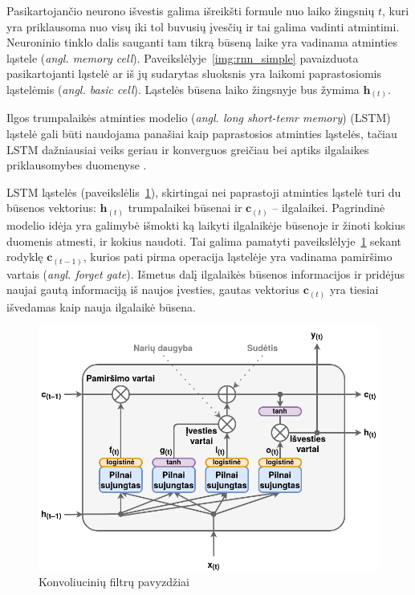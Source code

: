 \documentclass{VUMIFPSbakalaurinis}
\begin{document}
{	Pasikartojančio neurono išvestis galima išreikšti formule nuo laiko žingsnių \(t\), kuri yra priklausoma nuo visų iki tol buvusių įvesčių ir tai galima vadinti atmintimi. Neuroninio tinklo dalis sauganti tam tikrą būseną laike yra vadinama atminties ląstele (\textit{angl. memory cell}). Paveikslėlyje~\ref{img:rnn_simple} pavaizduota pasikartojanti ląstelė ar iš jų sudarytas sluoksnis yra laikomi paprastosiomis ląstelėmis (\textit{angl. basic cell}). Ląstelės būsena laiko žingsnyje bus žymima \(\mathbf{h}_{(t)}\).
}
\label{subsubsubsec:lstm}
{
	Ilgos trumpalaikės atminties modelio (\textit{angl. long short-temr memory}) (LSTM) ląstelė \cite{hochreiter_schmidhuber_1997, sak2014long} gali būti naudojama panašiai kaip paprastosios atminties ląstelės, tačiau LSTM dažniausiai veiks geriau ir konverguos greičiau bei aptiks ilgalaikes priklausomybes duomenyse \cite{handson}.\par
	
	LSTM ląstelės (paveikslėlis~\ref{img:lstm}), skirtingai nei paprastoji atminties ląstelė turi du būsenos vektorius: \(\mathbf{h}_{(t)}\) trumpalaikei būsenai ir  \(\mathbf{c}_{(t)}\) -- ilgalaikei. Pagrindinė modelio idėja yra galimybė išmokti ką laikyti ilgalaikėje būsenoje ir žinoti kokius duomenis atmesti, ir kokius naudoti. Tai galima pamatyti paveikslėlyje~\ref{img:lstm} sekant rodyklę \(\mathbf{c}_{(t-1)}\), kurios pati pirma operacija ląstelėje yra vadinama pamiršimo vartais (\textit{angl. forget gate}). Išmetus dalį ilgalaikės būsenos informacijos ir pridėjus naujai gautą informaciją iš naujos įvesties, gautas vektorius \(\mathbf{c}_{(t)}\) yra tiesiai išvedamas kaip nauja ilgalaikė būsena.
	
	\begin{figure}[H]
		\centering
		\includegraphics[scale=0.5]{img/lstm}
		\caption{Konvoliucinių filtrų pavyzdžiai}
		\label{img:lstm}
	\end{figure} 

}
\end{document}
